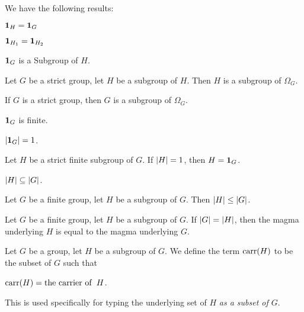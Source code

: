 \documentclass{article}
\begin{document}
We have the following results:
\begin{thm}
\item\label{group2:63} $\mathbf{1}_{H}=\mathbf{1}_{G}$
\item\label{group2:64} $\mathbf{1}_{H_{1}}=\mathbf{1}_{H_{2}}$
\item\label{group2:65} $\mathbf{1}_{G}$ is a Subgroup of $H$.
\item\label{group2:66} Let $G$ be a strict group, let $H$ be a subgroup
  of $H$. Then $H$ is a subgroup of $\Omega_{G}$.
\item\label{group2:67} If $G$ is a strict group, then $G$ is a subgroup
  of $\Omega_{G}$.
\item\label{group2:68} $\mathbf{1}_{G}$ is finite.
\item\label{group2:69} $|\mathbf{1}_{G}|=1$.
\item\label{group2:70} Let $H$ be a strict finite subgroup of $G$. If
  $|H|=1$, then $H=\mathbf{1}_{G}$.
\item\label{group2:71} $|H|\subseteq|G|$.
\item\label{group2:72} Let $G$ be a finite group, let $H$ be a subgroup
  of $G$. Then $|H|\leq|G|$.
\item\label{group2:73} Let $G$ be a finite group, let $H$ be a subgroup
  of $G$. If $|G|=|H|$, then the magma underlying $H$ is equal
  to the magma underlying $G$.
\end{thm}

\begin{definition}
Let $G$ be a group, let $H$ be a subgroup of $G$.
We define the term $\operatorname{carr}(H)$ to be the subset of $G$ such that
\begin{defn}
\item $\operatorname{carr}(H)=\operatorname{the\ carrier\ of\ }H$.
\end{defn}
\end{definition}

\begin{remark}
This is used specifically for typing the underlying set of $H$
\emph{as a subset of $G$}.
\end{remark}
\end{document}
